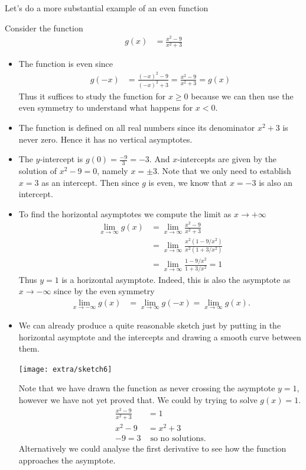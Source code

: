 Let's do a more substantial example of an even function
\begin{eg}\label{eg_3_6_4}
 Consider the function
\begin{align*}
  g(x) &= \frac{x^2-9}{x^2+3}
\end{align*}
\begin{itemize}
 \item The function is even since
\begin{align*}
  g(-x) &= \frac{(-x)^2-9}{(-x)^2+3} = \frac{x^2-9}{x^2+3} = g(x)
\end{align*}
  Thus it suffices to study the function for $x\geq0$ because we can then use the even
symmetry to understand what happens for $x<0$.

\item The function is defined on all real numbers since its denominator $x^2+3$ is never
zero. Hence it has no vertical asymptotes.
\item The $y$-intercept is $g(0) = \frac{-9}{3} = -3$. And $x$-intercepts are given by
the solution of $x^2-9=0$, namely $x=\pm 3$. Note that we only need to establish $x=3$ as
an intercept. Then since $g$ is even, we know that $x=-3$ is also an intercept.
\item To find the horizontal asymptotes we compute the limit as $x\to+\infty$
\begin{align*}
  \lim_{x\to \infty} g(x)
  &= \lim_{x\to \infty} \frac{x^2-9}{x^2+3} \\
  &= \lim_{x\to \infty} \frac{x^2(1-9/x^2)}{x^2(1+3/x^2)} \\
  &= \lim_{x\to \infty} \frac{1-9/x^2}{1+3/x^2} = 1
\end{align*}
Thus $y=1$ is a horizontal asymptote. Indeed, this is also the asymptote as $x\to-\infty$
since by the even symmetry
\begin{align*}
  \lim_{x\to -\infty} g(x)
  &=\lim_{x\to \infty} g(-x)
  = \lim_{x\to \infty} g(x).
\end{align*}
\item We can already produce a quite reasonable sketch just by putting in the horizontal
asymptote and the intercepts and drawing a smooth curve between them.
\begin{efig}
 \begin{center}
  \texttt{[image: extra/sketch6]}
 \end{center}
\end{efig}
Note that we have drawn the function as never crossing the asymptote $y=1$, however we
have not yet proved that.  We could by trying to solve $g(x)=1$.
\begin{align*}
  \frac{x^2-9}{x^2+3} &= 1 \\
  x^2-9 &= x^2+3 \\
  -9=3 & \text{ so no solutions.}
\end{align*}
Alternatively we could analyse the first derivative to see how the function approaches
the asymptote.


\end{itemize}
\end{eg}
